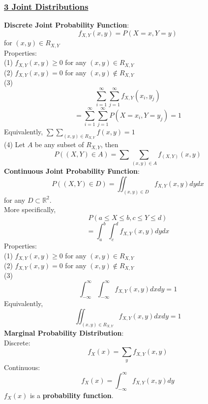 \documentclass{article}
\begin{document}
\titlespacing*{\subsubsection}{0pt}{0pt}{1pt}

\pagestyle{fancy}
\fancyhf{}
\renewcommand{\headrulewidth}{0pt}

\onehalfspacing

\setlength{\columnseprule}{0.2pt} %

\begin{multicols*}{3}

\subsubsection*{\underline{3 Joint Distributions}} 
\textbf{Discrete Joint Probability Function}:
$$f_{X,Y}(x,y)=P(X=x,Y=y)$$ for $(x,y)\in R_{X,Y}$ \\
Properties: \\
(1) $f_{X,Y}(x,y)\geq0$ for any $(x,y)\in R_{X,Y}$\\
(2) $f_{X,Y}(x,y)=0$ for any $(x,y)\not\in R_{X,Y}$\\
(3) $$\sum_{i=1}^{\infty}\sum_{j=1}^{\infty}f_{X,Y}(x_i,y_j)$$ $$=\sum_{i=1}^{\infty}\sum_{j=1}^{\infty}P(X=x_i,Y=y_j)=1$$ 
Equivalently, $\sum\sum_{(x,y)\in R_{X,Y}}f(x,y)=1$ \\
(4) Let $A$ be any subset of $R_{X,Y}$, then $$P((X,Y)\in A)=\sum\sum_{(x,y)\in A}f_{(X,Y)}(x,y)$$
\textbf{Continuous Joint Probability Function}:\\
$$P((X,Y)\in D)=\iint_{(x,y)\in D}f_{X,Y}(x,y)dy dx$$ for any $D\subset \mathbb{R}^2$. \\
More specifically, $$P(a\leq X\leq b, c\leq Y\leq d)$$
$$=\int^b_a\int^d_c f_{X,Y}(x,y)dydx$$
Properties: \\
(1) $f_{X,Y}(x,y)\geq0$ for any $(x,y)\in R_{X,Y}$\\
(2) $f_{X,Y}(x,y)=0$ for any $(x,y)\not\in R_{X,Y}$\\
(3) $$\int^{\infty}_{-\infty}\int^{\infty}_{-\infty}f_{X,Y}(x,y)dxdy=1$$ Equivalently, $$\iint_{(x,y)\in R_{X,Y}}f_{X,Y}(x,y)dxdy=1$$
\textbf{Marginal Probability Distribution}:\\
Discrete: $$f_X(x)=\sum_y f_{X,Y}(x,y)$$
Continuous: $$f_X(x)=\int^\infty_{-\infty}f_{X,Y}(x,y)dy$$
$f_X(x)$ is a \textbf{probability function}. \\

\end{multicols*}
\end{document}
